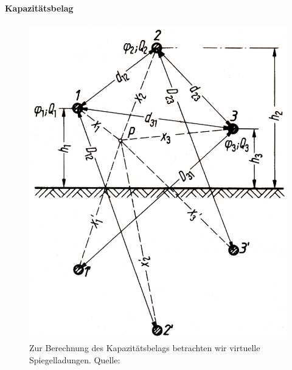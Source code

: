 \paragraph{Kapazitätsbelag}
\begin{figure}[tbhn]
\begin{center}
\noindent
\includegraphics[scale=1]{gespiegelterdrehstrom.png}
\end{center}
\caption{Zur Berechnung des Kapazitätsbelags betrachten wir virtuelle Spiegelladungen. Quelle: \cite{Flosdorff}} %
\label{pic:gespiegelterdrehstrom} 
\end{figure}

